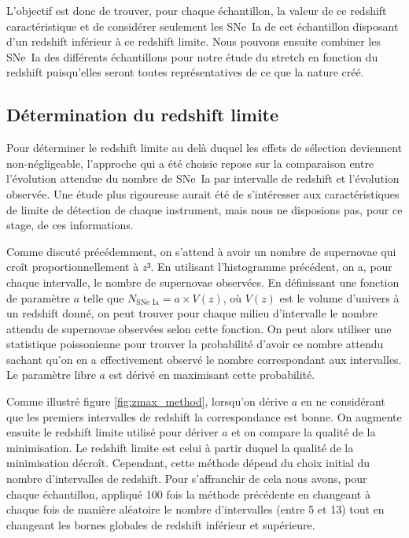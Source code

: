 \documentclass[a4paper, 12pt, svgnames]{article}
\begin{document}
L'objectif est donc de trouver, pour chaque échantillon, la valeur de ce
redshift caractéristique et de considérer seulement les SNe~Ia de cet
échantillon disposant d'un redshift inférieur à ce redshift limite. Nous pouvons
ensuite combiner les SNe~Ia des différents échantillons pour notre étude du
stretch en fonction du redshift puisqu'elles seront toutes représentatives de ce
que la nature créé.

\subsection{Détermination du redshift limite}\label{ssec:det}

Pour déterminer le redshift limite au delà duquel les effets de sélection
deviennent non-négligeable, l'approche qui a été choisie repose sur la
comparaison entre l'évolution attendue du nombre de SNe~Ia par intervalle de
redshift et l'évolution observée. Une étude plus rigoureuse aurait été de
s'intéresser aux caractéristiques de limite de détection de chaque instrument,
mais nous ne disposions pas, pour ce stage, de ces informations. \bigbreak

Comme discuté précédemment, on s'attend à avoir un nombre de supernovae qui
croît proportionnellement à $z³$. En utilisant l'histogramme précédent, on a,
pour chaque intervalle, le nombre de supernovae observées. En définissant une
fonction de paramètre $a$ telle que $N_{\text{SNe~Ia}} = a\times V(z)$, où
$V(z)$ est le volume d'univers à un redshift donné, on peut trouver pour chaque
milieu d'intervalle le nombre attendu de supernovae observées selon cette
fonction. On peut alors utiliser une statistique poissonienne pour trouver la
probabilité d'avoir ce nombre attendu sachant qu'on en a effectivement observé
le nombre correspondant aux intervalles. Le paramètre libre $a$ est dérivé
en maximisant cette probabilité. \bigbreak

Comme illustré figure \ref{fig:zmax_method}, lorsqu'on dérive $a$ en ne
considérant que les premiers intervalles de redshift la correspondance est
bonne. On augmente ensuite le redshift limite utilisé pour dériver $a$ et on
compare la qualité de la minimisation. Le redshift limite est celui à partir
duquel la qualité de la minimisation décroît. Cependant, cette méthode dépend du
choix initial du nombre d'intervalles de redshift. Pour s'affranchir de cela
nous avons, pour chaque échantillon, appliqué 100 fois la méthode précédente en
changeant à chaque fois de manière aléatoire le nombre d'intervalles (entre 5 et
13) tout en changeant les bornes globales de redshift inférieur et supérieure.
\bigbreak
\end{document}
